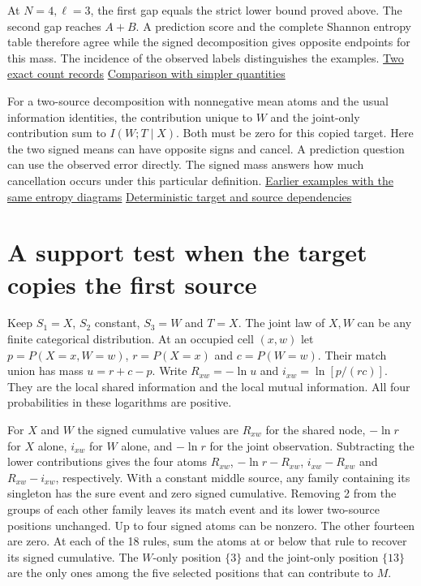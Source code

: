 At \(N=4,\ell=3\), the first gap equals the strict lower bound proved above. The second gap reaches \(A+B\). A prediction score and the complete Shannon entropy table therefore agree while the signed decomposition gives opposite endpoints for this mass. The incidence of the observed labels distinguishes the examples. \href{https://github.com/sepahead/pid-rs/blob/main/audit/research/categorical-third-source-budget-sharpness/independent/copy-target/PAIRED-COUNTS.json}{Two exact count records} \href{https://github.com/sepahead/pid-rs/blob/main/audit/research/categorical-third-source-budget-sharpness/independent/copy-target/SIGNIFICANCE.md}{Comparison with simpler quantities}

For a two-source decomposition with nonnegative mean atoms and the usual information identities, the contribution unique to \(W\) and the joint-only contribution sum to \(I(W;T\mid X)\). Both must be zero for this copied target. Here the two signed means can have opposite signs and cancel. A prediction question can use the observed error directly. The signed mass answers how much cancellation occurs under this particular definition. \href{https://doi.org/10.3390/e19100531}{Earlier examples with the same entropy diagrams} \href{https://doi.org/10.3390/e20030169}{Deterministic target and source dependencies}

\clearpage

\section{A support test when the target copies the first source}\label{a-support-test-when-the-target-copies-the-first-source}

Keep \(S_1=X\), \(S_2\) constant, \(S_3=W\) and \(T=X\). The joint law of \(X,W\) can be any finite categorical distribution. At an occupied cell \((x,w)\) let \(p=P(X=x,W=w)\), \(r=P(X=x)\) and \(c=P(W=w)\). Their match union has mass \(u=r+c-p\). Write \(R_{xw}=-\ln u\) and \(i_{xw}=\ln[p/(rc)]\). They are the local shared information and the local mutual information. All four probabilities in these logarithms are positive.

For \(X\) and \(W\) the signed cumulative values are \(R_{xw}\) for the shared node, \(-\ln r\) for \(X\) alone, \(i_{xw}\) for \(W\) alone, and \(-\ln r\) for the joint observation. Subtracting the lower contributions gives the four atoms \(R_{xw}\), \(-\ln r-R_{xw}\), \(i_{xw}-R_{xw}\) and \(R_{xw}-i_{xw}\), respectively. With a constant middle source, any family containing its singleton has the sure event and zero signed cumulative. Removing 2 from the groups of each other family leaves its match event and its lower two-source positions unchanged. Up to four signed atoms can be nonzero. The other fourteen are zero. At each of the 18 rules, sum the atoms at or below that rule to recover its signed cumulative. The \(W\)-only position \(\{3\}\) and the joint-only position \(\{13\}\) are the only ones among the five selected positions that can contribute to \(M\).


